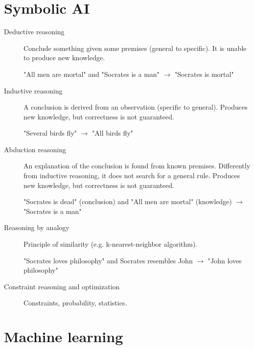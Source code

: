 \section{Symbolic AI}
\begin{description}
    \item[Deductive reasoning] 
        Conclude something given some premises (general to specific). 
        It is unable to produce new knowledge.
        \begin{example}
            "All men are mortal" and "Socrates is a man" $\rightarrow$ "Socrates is mortal"
        \end{example}
    
    \item[Inductive reasoning] 
        A conclusion is derived from an observation (specific to general).
        Produces new knowledge, but correctness is not guaranteed.
        \begin{example}
            "Several birds fly" $\rightarrow$ "All birds fly"
        \end{example}

    \item[Abduction reasoning] 
        An explanation of the conclusion is found from known premises.
        Differently from inductive reasoning, it does not search for a general rule.
        Produces new knowledge, but correctness is not guaranteed.
        \begin{example}
            "Socrates is dead" (conclusion) and "All men are mortal" (knowledge) $\rightarrow$ "Socrates is a man"
        \end{example}
    
    \item[Reasoning by analogy] 
        Principle of similarity (e.g. k-nearest-neighbor algorithm).
        \begin{example}
            "Socrates loves philosophy" and Socrates resembles John $\rightarrow$ "John loves philosophy"
        \end{example}

    \item[Constraint reasoning and optimization] 
        Constraints, probability, statistics.
\end{description}


\section{Machine learning}

